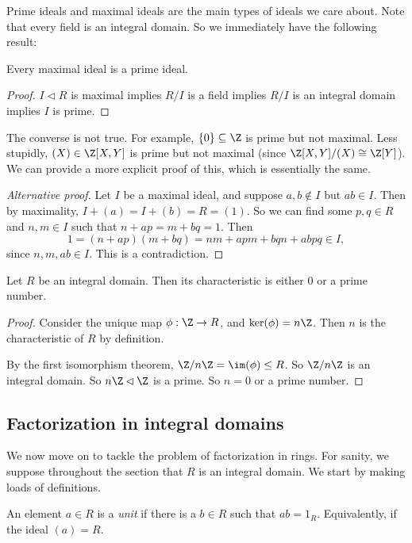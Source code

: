 \documentclass[a4paper]{article}
\begin{document}
Prime ideals and maximal ideals are the main types of ideals we care about. Note that every field is an integral domain. So we immediately have the following result:
\begin{prop}
  Every maximal ideal is a prime ideal.
\end{prop}

\begin{proof}
  $I \lhd R$ is maximal implies $R/I$ is a field implies $R/I$ is an integral domain implies $I$ is prime.
\end{proof}
The converse is not true. For example, $\{0\} \subseteq \Z$ is prime but not maximal. Less stupidly, $(X) \in \Z[X, Y]$ is prime but not maximal (since $\Z[X, Y]/(X) \cong \Z[Y]$). We can provide a more explicit proof of this, which is essentially the same.

\begin{proof}[Alternative proof]
  Let $I$ be a maximal ideal, and suppose $a, b \not \in I$ but $ab \in I$. Then by maximality, $I + (a) = I + (b) = R = (1)$. So we can find some $p, q \in R$ and $n, m \in I$ such that $n + ap = m + bq = 1$. Then
  \[
    1 = (n + ap)(m + bq) = nm + apm + bqn + ab pq \in I,
  \]
  since $n, m, ab \in I$. This is a contradiction.
\end{proof}

\begin{lemma}
  Let $R$ be an integral domain. Then its characteristic is either $0$ or a prime number.
\end{lemma}

\begin{proof}
  Consider the unique map $\phi: \Z \to R$, and $\ker(\phi) = n\Z$. Then $n$ is the characteristic of $R$ by definition.

  By the first isomorphism theorem, $\Z/n\Z = \im(\phi) \leq R$. So $\Z/n\Z$ is an integral domain. So $n\Z \lhd \Z$ is a prime. So $n = 0$ or a prime number.
\end{proof}

\subsection{Factorization in integral domains}
We now move on to tackle the problem of factorization in rings. For sanity, we suppose throughout the section that $R$ is an integral domain. We start by making loads of definitions.

\begin{defi}[Unit]
  An element $a \in R$ is a \emph{unit} if there is a $b \in R$ such that $ab = 1_R$. Equivalently, if the ideal $(a) = R$.
\end{defi}
\end{document}
